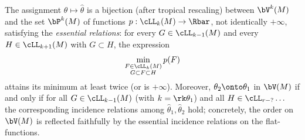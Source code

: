 \begin{proposition}\label{prop:essential-relations}
The assignment $\theta\mapsto\widehat\theta$ is a bijection (after tropical
rescaling) between $\bV^k(M)$ and the set $\bP^k(M)$ of functions
$p:\cLL_k(M)\to\Rbar$, not identically $+\infty$, satisfying the
\emph{essential relations}: for every $G\in\cLL_{k-1}(M)$ and every
$H\in\cLL_{k+1}(M)$ with $G\subset H$, the expression
\begin{equation}\label{eqn:essential}
\min_{\substack{F\in\cLL_k(M)\\ G\subset F\subset H}} p(F)
\end{equation}
attains its minimum at least twice (or is $+\infty$). Moreover, $\theta_2\onto
\theta_1$ in $\bV(M)$ if and only if for all $G\in\cLL_{k-1}(M)$ (with
$k=\rk\theta_1$) and all $H\in\cLL_{r-?}\dots$ the corresponding incidence
relations among $\widehat\theta_1,\widehat\theta_2$ hold; concretely, the order
on $\bV(M)$ is reflected faithfully by the essential incidence relations on the
flat-functions.
\end{proposition}

